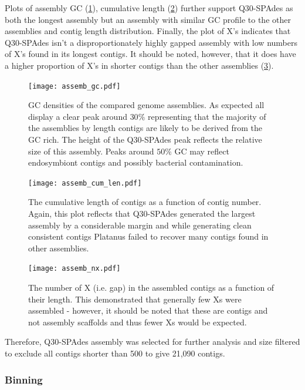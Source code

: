 Plots of assembly GC (\cref{fig:assemb_gc}), cumulative length (\cref{fig:assemb_len})
further support Q30-SPAdes as both the longest assembly
but an assembly with similar GC profile to the other assemblies and contig length distribution.
Finally, the plot of X's indicates that Q30-SPAdes isn't a disproportionately highly gapped
assembly with low numbers of X's found in its longest contigs.  It should be noted, however,
that it does have a higher proportion of X's in shorter contigs than the other
assemblies (\cref{fig:assemb_nx}).

\begin{figure}
    \centering
    \texttt{[image: assemb\_gc.pdf]}
    \caption[Genome assembly GC densities]{GC densities of the compared genome assemblies.  As expected
        all display a clear peak around \(30\%\) representing that the majority
    of the assemblies by length contigs are likely to be derived from the GC rich.
The height of the Q30-SPAdes peak reflects the relative size of this assembly.
Peaks around \(50\%\) GC may reflect endosymbiont contigs and possibly
bacterial contamination.}
    \label{fig:assemb_gc}
\end{figure}

\begin{figure}
    \centering
    \texttt{[image: assemb\_cum\_len.pdf]}
    \caption[Genome Assembly Cumulative Contig Lengths]{The cumulative length of contigs as a function of
        contig number.  Again, this plot reflects
        that Q30-SPAdes generated the largest assembly
        by a considerable margin and while generating
        clean consistent contigs Platanus failed to recover
    many contigs found in other assemblies.}
    \label{fig:assemb_len}
\end{figure}

\begin{figure}
    \centering
    \texttt{[image: assemb\_nx.pdf]}
    \caption[Genome assembly gaps]{The number of X (i.e. gap) in the assembled contigs as a function of their
        length.  This demonstrated that generally few Xs were assembled - however, it should 
        be noted that these are contigs and not assembly scaffolds and thus fewer Xs
    would be expected.}
    \label{fig:assemb_nx}
\end{figure}

Therefore, Q30-SPAdes assembly was selected for further analysis
and size filtered to exclude all contigs shorter than \SI{500}{\bp} 
to give 21,090 contigs. 

\subsubsection{Binning}


